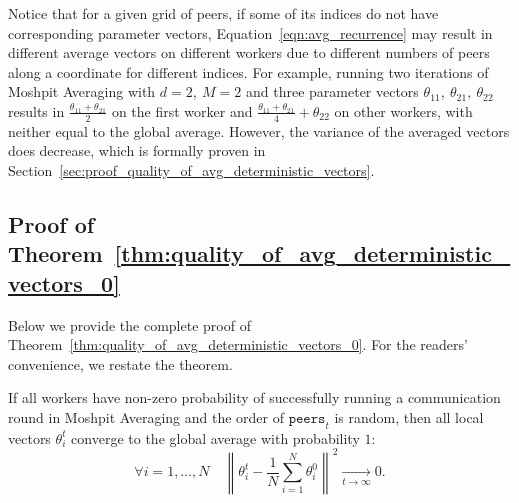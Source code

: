 Notice that for a given grid of peers, if some of its indices do not have corresponding parameter vectors, Equation~\ref{eqn:avg_recurrence} may result in different average vectors on different workers due to different numbers of peers along a coordinate for different indices. For example, running two iterations of Moshpit Averaging with $d=2,\ M=2$ and three parameter vectors $\theta_{11},\ \theta_{21},\ \theta_{22}$ results in $\frac{\theta_{11}+\theta_{21}}{2}$ on the first worker and $\frac{\theta_{11}+\theta_{21}}{4}+\theta_{22}$ on other workers, with neither equal to the global average. However, the variance of the averaged vectors does decrease, which is formally proven in Section~\ref{sec:proof_quality_of_avg_deterministic_vectors}.

\subsection{Proof of Theorem~\ref{thm:quality_of_avg_deterministic_vectors_0}}\label{sect:correctness_proof}
Below we provide the complete proof of Theorem~\ref{thm:quality_of_avg_deterministic_vectors_0}. For the readers' convenience, we restate the theorem.
\begin{theorem}\label{thm:quality_of_avg_deterministic_vectors_0_supp}
If all workers have non-zero probability of successfully running a communication round in Moshpit Averaging and the order of $\texttt{peers}_t$ is random, then all local vectors $\theta^t_i$ converge to the global average with probability $1$:
\begin{equation}
    \forall i = 1,\ldots, N\quad \left\|\theta^t_i - \frac1N \sum_{i=1}^N \theta^0_i\right\|^2 \xrightarrow[t\to\infty]{} 0.\label{eq:quality_of_avg_deterministic_vectors_0_supp}
\end{equation}
\end{theorem}

